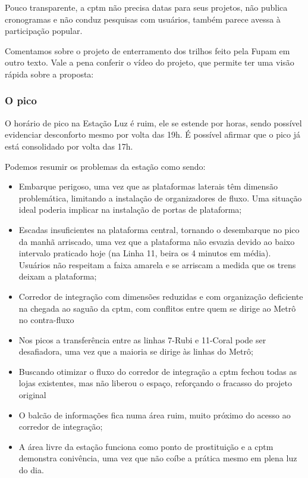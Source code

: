 \documentclass[11pt,fleqn]{book} %
\begin{document}
Pouco transparente, a \gls{cptm} não precisa datas para seus projetos, não publica cronogramas e não conduz pesquisas com usuários, também parece avessa à participação popular.

Comentamos sobre o projeto de enterramento dos trilhos feito pela Fupam em outro texto. Vale a pena conferir o vídeo do projeto, que permite ter uma visão rápida sobre a proposta:


\subsubsection{O pico}

O horário de pico na Estação Luz é ruim, ele se estende por horas, sendo possível evidenciar desconforto mesmo por volta das 19h. É possível afirmar que o pico já está consolidado por volta das 17h.

Podemos resumir os problemas da estação como sendo:

\begin{itemize}
	\item Embarque perigoso, uma vez que as plataformas laterais têm dimensão problemática, limitando a instalação de organizadores de fluxo. Uma situação ideal poderia implicar na instalação de portas de plataforma;
	\item Escadas insuficientes na plataforma central, tornando o desembarque no pico da manhã arriscado, uma vez que a plataforma não esvazia devido ao baixo intervalo praticado hoje (na Linha 11, beira os 4 minutos em média). Usuários não respeitam a faixa amarela e se arriscam a medida que os trens deixam a plataforma;
	\item Corredor de integração com dimensões reduzidas e com organização deficiente na chegada ao saguão da \gls{cptm}, com conflitos entre quem se dirige ao Metrô no contra-fluxo
	\item Nos picos a transferência entre as linhas 7-Rubi e 11-Coral pode ser desafiadora, uma vez que a maioria se dirige às linhas do Metrô;
	\item Buscando otimizar o fluxo do corredor de integração a \gls{cptm} fechou todas as lojas existentes, mas não liberou o espaço, reforçando o fracasso do projeto original
	\item O balcão de informações fica numa área ruim, muito próximo do acesso ao corredor de integração;
	\item A área livre da estação funciona como ponto de prostituição e a \gls{cptm} demonstra conivência, uma vez que não coíbe a prática mesmo em plena luz do dia.
\end{itemize}
\end{document}
